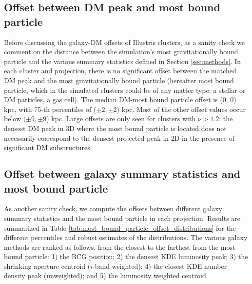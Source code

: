 \documentclass[usenatbib]{mn2e}
\begin{document}
{\subsection{Offset between DM peak and most
bound particle}
\label{subsec:offset_from_most_bound_particle}
Before discussing the galaxy-DM offsets of Illustris clusters, as a sanity check we comment on the distance between the simulation's most gravitationally bound particle and the various summary statistics defined in Section \ref{sec:methods}.
In each cluster and projection, there is no significant offset between the matched DM peak and 
the most gravitationally bound particle (hereafter most bound particle, which in the simulated clusters could be of any matter type: a stellar or DM particles, a gas cell).
The median DM-most bound particle offset is (0, 0) kpc, with 75-th percentiles of ($\pm2,\pm2$) kpc. 
Most of the other offset values occur below ($\pm 9, \pm 9$) kpc. Large offsets
are only seen for clusters with $\nu > 1.2$: the densest DM peak in 3D where
the most bound particle is located does not necessarily correspond to the densest projected peak in 2D in the presence of 
significant DM substructures.   

\subsection{Offset between galaxy summary statistics and most
bound particle}
As another sanity check, we compute the offsets between different galaxy summary
statistics and the most bound particle in each projection. Results are summarized in Table
\ref{tab:most_bound_particle_offset_distributions} for the different 
percentiles and robust estimates of the distributions.
The various galaxy methods are ranked as follows, from the closest to the farthest from the most bound particle:
1) the BCG position; 2) the densest KDE luminosity peak; 3) the shrinking aperture centroid ($i$-band weighted); 4) the closest KDE number density peak (unweighted); and 5) the luminosity weighted centroid.

}
\end{document}
